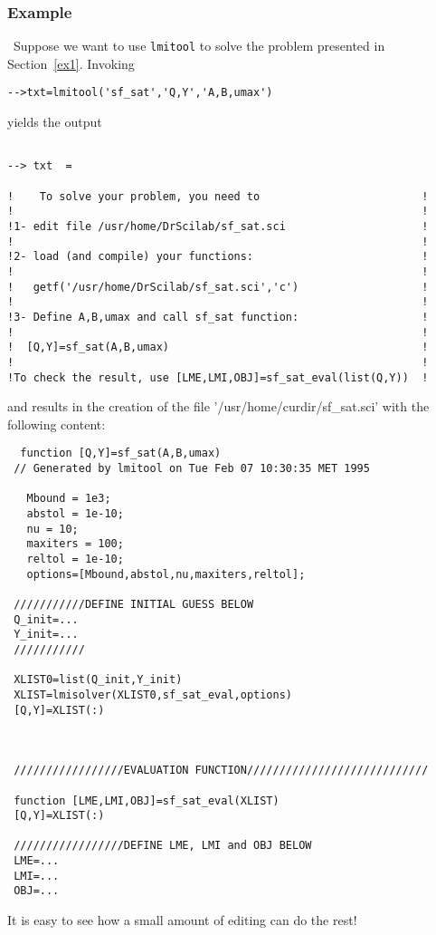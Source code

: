 \subsubsection{Example}\
Suppose we want to use {\tt lmitool} to solve the problem
presented in Section~\ref{ex1}. Invoking
\begin{verbatim}
-->txt=lmitool('sf_sat','Q,Y','A,B,umax')
\end{verbatim}
yields the output
\begin{verbatim}

--> txt  = 
 
!    To solve your problem, you need to                         !
!                                                               !
!1- edit file /usr/home/DrScilab/sf_sat.sci                     !
!                                                               !
!2- load (and compile) your functions:                          !
!                                                               !
!   getf('/usr/home/DrScilab/sf_sat.sci','c')                   !
!                                                               !
!3- Define A,B,umax and call sf_sat function:                   !
!                                                               !
!  [Q,Y]=sf_sat(A,B,umax)                                       !
!                                                               !
!To check the result, use [LME,LMI,OBJ]=sf_sat_eval(list(Q,Y))  !

\end{verbatim}
and results in the creation of the file '/usr/home/curdir/sf{\_}sat.sci'
with the following content:
\begin{verbatim}
  function [Q,Y]=sf_sat(A,B,umax)
 // Generated by lmitool on Tue Feb 07 10:30:35 MET 1995
   
   Mbound = 1e3;
   abstol = 1e-10;
   nu = 10;
   maxiters = 100;
   reltol = 1e-10;
   options=[Mbound,abstol,nu,maxiters,reltol];
    
 ///////////DEFINE INITIAL GUESS BELOW
 Q_init=...
 Y_init=...
 /////////// 
  
 XLIST0=list(Q_init,Y_init)
 XLIST=lmisolver(XLIST0,sf_sat_eval,options)
 [Q,Y]=XLIST(:)
  
  
  
 /////////////////EVALUATION FUNCTION////////////////////////////
  
 function [LME,LMI,OBJ]=sf_sat_eval(XLIST)
 [Q,Y]=XLIST(:)
  
 /////////////////DEFINE LME, LMI and OBJ BELOW
 LME=...
 LMI=...
 OBJ=...
\end{verbatim}
It is easy to see how a small amount of editing can 
do the rest!


